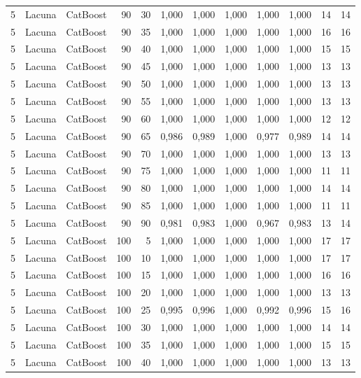 \begin{longtable}{@{}rllrrrrrrrrr@{}}
5 & Lacuna & CatBoost & 90 & 30 & 1,000 & 1,000 & 1,000 & 1,000 & 1,000 & 14 & 14 \\
5 & Lacuna & CatBoost & 90 & 35 & 1,000 & 1,000 & 1,000 & 1,000 & 1,000 & 16 & 16 \\
5 & Lacuna & CatBoost & 90 & 40 & 1,000 & 1,000 & 1,000 & 1,000 & 1,000 & 15 & 15 \\
5 & Lacuna & CatBoost & 90 & 45 & 1,000 & 1,000 & 1,000 & 1,000 & 1,000 & 13 & 13 \\
5 & Lacuna & CatBoost & 90 & 50 & 1,000 & 1,000 & 1,000 & 1,000 & 1,000 & 13 & 13 \\
5 & Lacuna & CatBoost & 90 & 55 & 1,000 & 1,000 & 1,000 & 1,000 & 1,000 & 13 & 13 \\
5 & Lacuna & CatBoost & 90 & 60 & 1,000 & 1,000 & 1,000 & 1,000 & 1,000 & 12 & 12 \\
5 & Lacuna & CatBoost & 90 & 65 & 0,986 & 0,989 & 1,000 & 0,977 & 0,989 & 14 & 14 \\
5 & Lacuna & CatBoost & 90 & 70 & 1,000 & 1,000 & 1,000 & 1,000 & 1,000 & 13 & 13 \\
5 & Lacuna & CatBoost & 90 & 75 & 1,000 & 1,000 & 1,000 & 1,000 & 1,000 & 11 & 11 \\
5 & Lacuna & CatBoost & 90 & 80 & 1,000 & 1,000 & 1,000 & 1,000 & 1,000 & 14 & 14 \\
5 & Lacuna & CatBoost & 90 & 85 & 1,000 & 1,000 & 1,000 & 1,000 & 1,000 & 11 & 11 \\
5 & Lacuna & CatBoost & 90 & 90 & 0,981 & 0,983 & 1,000 & 0,967 & 0,983 & 13 & 14 \\
5 & Lacuna & CatBoost & 100 & 5 & 1,000 & 1,000 & 1,000 & 1,000 & 1,000 & 17 & 17 \\
5 & Lacuna & CatBoost & 100 & 10 & 1,000 & 1,000 & 1,000 & 1,000 & 1,000 & 17 & 17 \\
5 & Lacuna & CatBoost & 100 & 15 & 1,000 & 1,000 & 1,000 & 1,000 & 1,000 & 16 & 16 \\
5 & Lacuna & CatBoost & 100 & 20 & 1,000 & 1,000 & 1,000 & 1,000 & 1,000 & 13 & 13 \\
5 & Lacuna & CatBoost & 100 & 25 & 0,995 & 0,996 & 1,000 & 0,992 & 0,996 & 15 & 16 \\
5 & Lacuna & CatBoost & 100 & 30 & 1,000 & 1,000 & 1,000 & 1,000 & 1,000 & 14 & 14 \\
5 & Lacuna & CatBoost & 100 & 35 & 1,000 & 1,000 & 1,000 & 1,000 & 1,000 & 15 & 15 \\
5 & Lacuna & CatBoost & 100 & 40 & 1,000 & 1,000 & 1,000 & 1,000 & 1,000 & 13 & 13 \\

\end{longtable}
